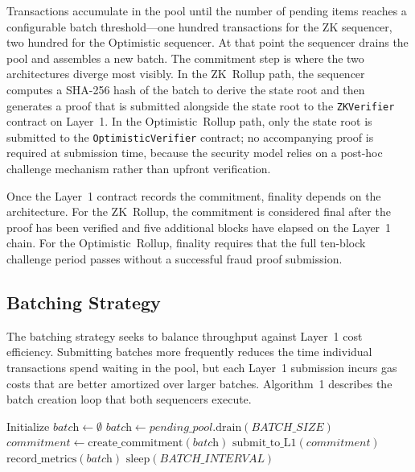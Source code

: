 Transactions accumulate in the pool until the number of pending items reaches a configurable batch threshold---one hundred transactions for the ZK sequencer, two hundred for the Optimistic sequencer. At that point the sequencer drains the pool and assembles a new batch. The commitment step is where the two architectures diverge most visibly. In the ZK~Rollup path, the sequencer computes a SHA-256 hash of the batch to derive the state root and then generates a proof that is submitted alongside the state root to the \texttt{ZKVerifier} contract on Layer~1. In the Optimistic~Rollup path, only the state root is submitted to the \texttt{OptimisticVerifier} contract; no accompanying proof is required at submission time, because the security model relies on a post-hoc challenge mechanism rather than upfront verification.

Once the Layer~1 contract records the commitment, finality depends on the architecture. For the ZK~Rollup, the commitment is considered final after the proof has been verified and five additional blocks have elapsed on the Layer~1 chain. For the Optimistic~Rollup, finality requires that the full ten-block challenge period passes without a successful fraud proof submission.

\subsection{Batching Strategy}

The batching strategy seeks to balance throughput against Layer~1 cost efficiency. Submitting batches more frequently reduces the time individual transactions spend waiting in the pool, but each Layer~1 submission incurs gas costs that are better amortized over larger batches. Algorithm~1 describes the batch creation loop that both sequencers execute.

\begin{algorithm}
    \caption{Batch Creation Loop}
    \begin{algorithmic}
        \STATE Initialize $\textit{batch} \leftarrow \emptyset$
        \LOOP
                \STATE $\textit{batch} \leftarrow \textit{pending\_pool}.\text{drain}(\textit{BATCH\_SIZE})$
                \STATE $\textit{commitment} \leftarrow \text{create\_commitment}(\textit{batch})$
                \STATE $\text{submit\_to\_L1}(\textit{commitment})$
                \STATE $\text{record\_metrics}(\textit{batch})$
            \ENDIF
            \STATE $\text{sleep}(\textit{BATCH\_INTERVAL})$
        \ENDLOOP
    \end{algorithmic}
\end{algorithm}

